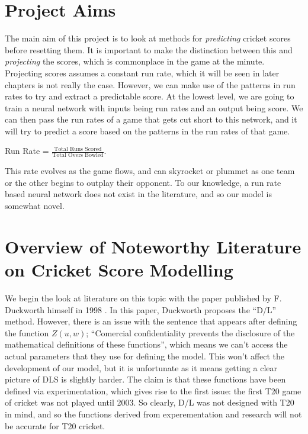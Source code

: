 \section{Project Aims}
The main aim of this project is to look at methods for \textit{predicting} cricket scores before resetting them. It is important to make the distinction between this 
and \textit{projecting} the scores, which is commonplace in the game at the minute. Projecting scores assumes a constant run rate, which it will be seen 
in later chapters is not really the case. However, we can make use of the patterns in run rates to try and extract a predictable score. At the lowest level,
we are going to train a neural network with inputs being run rates and an output being score. We can then pass the run rates of a game that gets cut short 
to this network, and it will try to predict a score based on the patterns in the run rates of that game.

\begin{definition}
    Run Rate  = $\frac{\text{Total Runs Scored}}{\text{Total Overs Bowled}}$.
\end{definition}

This rate evolves as the game flows, and can skyrocket or plummet as one team or the other begins to outplay their opponent. To our knowledge, a run rate 
based neural network does not exist in the literature, and so our model is somewhat novel.

\section{Overview of Noteworthy Literature on Cricket Score Modelling}
We begin the look at literature on this topic with the paper published by F. Duckworth himself in 1998 \cite{duckworth}. In this paper, 
Duckworth proposes the ``D/L'' method. However, there is an issue with the sentence that appears after defining the function $Z(u,w)$;
``Comercial confidentiality prevents the disclosure of the mathematical definitions of these functions'', which means we can't access the actual parameters 
that they use for defining the model. This won't affect the development of our model, but it is unfortunate as it means getting a clear picture of DLS is slightly harder.
The claim is that these functions have been defined via experimentation, which gives rise to the first issue: the first T20 game of cricket was not played until 2003. 
So clearly, D/L was not designed with T20 in mind, and so the functions derived from experementation and research will not be accurate for T20 cricket. \\

